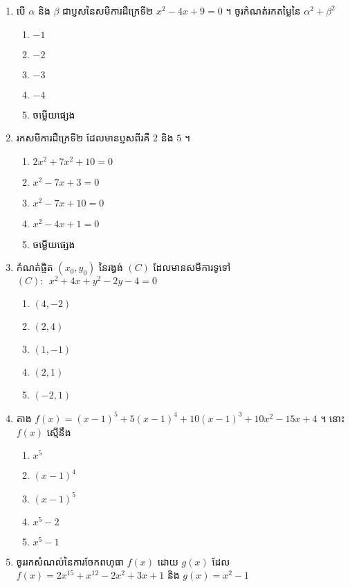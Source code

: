\documentclass[12pt, a4paper]{article}
\begin{document}
\begin{enumerate}[m]
	\item បើ $\alpha$ និង $\beta$ ជាប្ញសនៃសមីការដឺក្រេទី២ $x^2-4x+9=0$ ។ ចូរកំណត់រកតម្លៃនៃ $\alpha^{2}+\beta^{2}$ 
	\begin{enumerate}[k,5]
		\item $-1$
		\item $-2$
		\item $-3$
		\item $-4$
		\item ចម្លើយផ្សេង
	\end{enumerate}
	{\color{blue}\hrulefill}
	\item រកសមីការដឺក្រេទី២ ដែលមានប្ញសពីរគឺ $2$ និង $5$ ។ 
	\begin{enumerate}[k,3]
		\item $2x^2+7x^2+10=0$
		\item $x^2-7x+3=0$
		\item $x^2-7x+10=0$
		\item $x^2-4x+1=0$
		\item ចម្លើយផ្សេង
	\end{enumerate}
	{\color{blue}\hrulefill}
	\item កំណត់ផ្ចិត $(x_0, y_0)$ នៃរង្វង់ $\left(C\right)$ ដែលមានសមីការទូទៅ $\left(C\right):~~x^2+4x+y^2-2y-4=0$
	\begin{enumerate}[k,5]
		\item $\left(4,-2\right)$
		\item $\left(2,4\right)$
		\item $\left(1,-1\right)$
		\item $\left(2,1\right)$
		\item $\left(-2,1\right)$
	\end{enumerate}
	{\color{blue}\hrulefill}
	\item តាង $f(x)=\left(x-1\right)^{5}+5\left(x-1\right)^{4}+10\left(x-1\right)^{3}+10x^2-15x+4$ ។ នោះ $f(x)$ ស្មើនឹង
	\begin{enumerate}[k,5]
		\item $x^5$
		\item $\left(x-1\right)^4$
		\item $\left(x-1\right)^5$
		\item $x^5-2$
		\item $x^5-1$
	\end{enumerate}
	{\color{blue}\hrulefill}
	\item ចូររកសំណល់នៃការចែកពហុធា $f(x)$ ដោយ $g(x)$ ដែល $f(x)=2x^{15}+x^{12}-2x^2+3x+1$ និង $g(x)=x^2-1$ 
	\begin{enumerate}[k,5]

\end{enumerate}
\end{enumerate}
\end{document}
